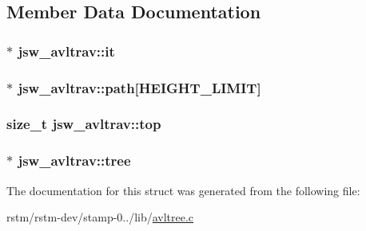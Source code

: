 \subsection{Member Data Documentation}
\hypertarget{structjsw__avltrav_acfd4c49213f67888c8a9624e1342c56e}{
\subsubsection[{it}]{$\ast$ jsw\-\_\-avltrav\-::it}}\label{structjsw__avltrav_acfd4c49213f67888c8a9624e1342c56e}
\hypertarget{structjsw__avltrav_a5a1972b74cbe3476115940fb25f50799}{
\subsubsection[{path}]{$\ast$ jsw\-\_\-avltrav\-::path\mbox{[}{\bf H\-E\-I\-G\-H\-T\-\_\-\-L\-I\-M\-I\-T}\mbox{]}}}\label{structjsw__avltrav_a5a1972b74cbe3476115940fb25f50799}
\hypertarget{structjsw__avltrav_aa2c8a23244b4e292704f53dd2962f15e}{
\subsubsection[{top}]{\setlength{\rightskip}{0pt plus 5cm}size\-\_\-t jsw\-\_\-avltrav\-::top}}\label{structjsw__avltrav_aa2c8a23244b4e292704f53dd2962f15e}
\hypertarget{structjsw__avltrav_afb44d2be6eaf537a2378840512abd785}{
\subsubsection[{tree}]{$\ast$ jsw\-\_\-avltrav\-::tree}}\label{structjsw__avltrav_afb44d2be6eaf537a2378840512abd785}


The documentation for this struct was generated from the following file\-:\begin{DoxyCompactItemize}
\item 
rstm/rstm-\/dev/stamp-\/0../lib/\hyperlink{avltree_8c}{avltree.\-c}\end{DoxyCompactItemize}
